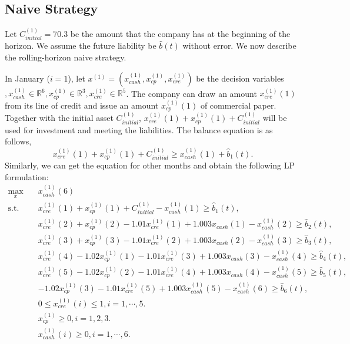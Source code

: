 \documentclass[13pt]{article}
\begin{document}
\subsection{Naive Strategy}

    Let $C^{(1)}_{initial} = 70.3$ be the amount that the company has at the beginning of the horizon. We assume the future liability be $\hat{b}(t)$ without error. We now describe the rolling-horizon naive strategy.
    
    In January ($i = 1$), let $x^{(1)}=(x^{(1)}_{cash}, x^{(1)}_{cp}, x^{(1)}_{cre})$ be the decision variables $, x^{(1)}_{cash}\in\mathbb{R}^6, x^{(1)}_{cp}\in\mathbb{R}^3, x^{(1)}_{cre}\in\mathbb{R}^5$. The company can draw an amount $x^{(1)}_{cre}(1)$ from its line of credit and issue an amount $x^{(1)}_{cp}(1)$ of commercial paper. Together with the initial asset $C^{(1)}_{initial}$, $x^{(1)}_{cre}(1)+x^{(1)}_{cp}(1)+C^{(1)}_{initial}$ will be used for investment and meeting the liabilities. The balance equation is as follows, 
    \[
        x^{(1)}_{cre}(1)+x^{(1)}_{cp}(1)+C^{(1)}_{initial}\geq x^{(1)}_{cash}(1) + \hat{b}_1(t).
    \]
    Similarly, we can get the equation for other months and obtain the following LP formulation:
    \[
        \begin{split}
            \max_{x} \quad & x^{(1)}_{cash}(6) \\
            \text{s.t.} \quad 
            & x^{(1)}_{cre}(1) + x^{(1)}_{cp}(1)+C^{(1)}_{initial}-x^{(1)}_{cash}(1) \geq \hat{b}_1(t), \\
            & x^{(1)}_{cre}(2) + x^{(1)}_{cp}(2) -1.01x^{(1)}_{cre}(1) + 1.003x_{cash}(1) -x^{(1)}_{cash}(2) \geq \hat{b}_2(t),  \\
            & x^{(1)}_{cre}(3) + x^{(1)}_{cp}(3) -1.01x^{(1)}_{cre}(2) + 1.003x_{cash}(2) -x^{(1)}_{cash}(3) \geq \hat{b}_3(t),  \\
            & x^{(1)}_{cre}(4) - 1.02x^{(1)}_{cp}(1) - 1.01x^{(1)}_{cre}(3) + 1.003x_{cash}(3) - x^{(1)}_{cash}(4) \geq \hat{b}_4(t),  \\
            & x^{(1)}_{cre}(5) - 1.02x^{(1)}_{cp}(2) - 1.01x^{(1)}_{cre}(4) + 1.003x_{cash}(4) - x^{(1)}_{cash}(5) \geq \hat{b}_5(t),  \\
            & - 1.02x^{(1)}_{cp}(3) - 1.01x^{(1)}_{cre}(5) + 1.003x^{(1)}_{cash}(5) - x^{(1)}_{cash}(6) \geq \hat{b}_6(t),  \\
            & 0 \leq x^{(1)}_{cre}(i) \leq 1, i = 1, \cdots, 5.\\
            & x^{(1)}_{cp} \geq 0, i = 1, 2, 3.\\
            & x^{(1)}_{cash}(i)\geq 0, i = 1, \cdots, 6.
        \end{split}
    \]
\end{document}

